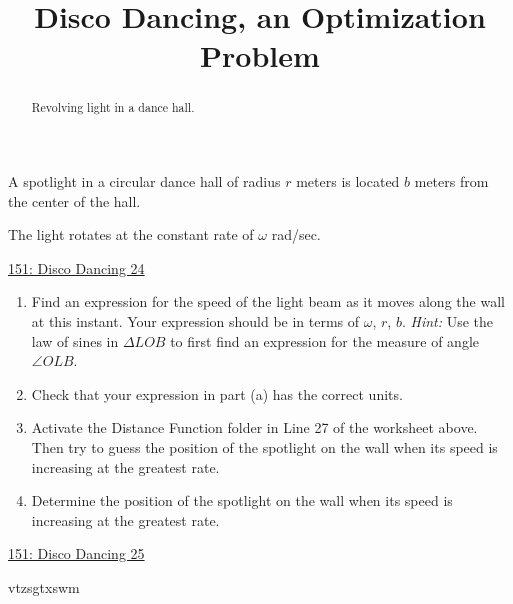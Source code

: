 \documentclass{ximera}
\title{Disco Dancing, an Optimization Problem}
\begin{document}
\begin{abstract}
Revolving light in a dance hall.
\end{abstract}
\maketitle

\begin{question}  \label{QdsadfKGDCCCC}
A spotlight in a circular dance hall of radius $r$ meters is located $b$ meters from the center of the hall. 

The light rotates at the constant rate of $\omega$ rad/sec. 

\begin{onlineOnly}
   \begin{center}
\end{center}
\end{onlineOnly}

\href{https://www.desmos.com/calculator/dve2veveuw}{151: Disco Dancing 24}


\begin{enumerate}
\item Find an expression for the speed of the light beam as it moves along the wall at this instant. Your expression should be in terms of $\omega$, $r$, $b$. \emph{Hint:} Use the law of sines in $\Delta LOB$ to first find an expression for the measure of angle $\angle OLB$.

\item Check that your expression in  part (a) has the correct units.

\item Activate the Distance Function folder in Line 27 of the worksheet above. Then try to guess the position of the spotlight on the wall when its speed is increasing at the greatest rate. 

\item Determine the position of the spotlight on the wall when its speed is increasing at the greatest rate.

\end{enumerate}

\end{question}

\begin{onlineOnly}
   \begin{center}
\end{center}
\end{onlineOnly}

\href{https://www.desmos.com/calculator/vtzsgtxswm}{151: Disco Dancing 25}  %

vtzsgtxswm
\end{document}
